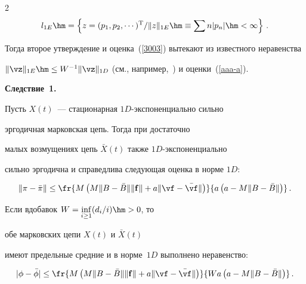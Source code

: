 \begin{multicols}{2}
$$

l_{1E}\hm=\left\{z=(p_1,p_2,\cdots)^{\mathrm{T}} / \|z\|_{1E}\hm\equiv\sum n |p_n| \hm<

\infty\right\}\,.

$$



Тогда второе утверждение и оценка~(\ref{3003}) вытекают из известного неравенства

$\|\vz\|_{1E}\hm\le W^{-1}\|\vz\|_{1D}$ (см., например,~\cite{z06}) и оценки~(\ref{aaa-a}).









\medskip



\noindent

\textbf{Следствие~1.}\

Пусть  $X(t)$~--- стационарная $1D$-экс\-по\-нен\-ци\-аль\-но сильно

эргодичная марковская цепь. Тогда при достаточно

малых возмущениях цепь $\bar{X}(t)$ также $1D$-экс\-по\-нен\-ци\-аль\-но

сильно эргодична и справедлива следующая оценка в норме $1D$:

\begin{equation*}

 \|{\bf \pi}- {\bar{\bf \pi}}\| \le

\fr{M\left(M\| B -\bar{B}\| \|{\bf f}\|  + a\|\vf

-\bar{\vf}\|\right)}{a\left(a - M\|B -\bar{B}\|\right)}\,.


\end{equation*}

Если вдобавок $W=\inf\limits_{i \ge 1} (d_i/i)\hm > 0$, то

обе марковских цепи $X(t)$ и $\bar{X}(t)$

имеют предельные средние и в норме~$1D$ выполнено неравенство:

\begin{equation*}

|\phi - \bar{\phi}|\le

\fr{M\left(M\| B -\bar{B}\| \|{\bf f}\|  + a\|\vf -\bar{\vf}\|\right)}

{Wa\left(a - M\|B -\bar{B}\|\right)}\,.


\end{equation*}




\end{multicols}
